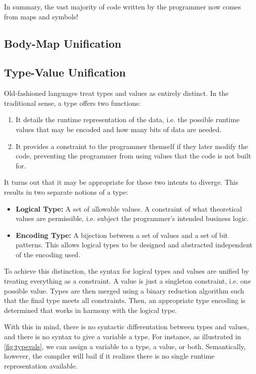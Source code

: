 \documentclass[12pt,a4paper,twoside]{report}
\begin{document}
In summary, the vast majority of code written by the programmer now comes from maps and symbols!

\subsection{Body-Map Unification}



\subsection{Type-Value Unification}

Old-fashioned languages treat types and values as entirely distinct. In the traditional sense, a type offers two functions:

\begin{enumerate}
\item It details the runtime representation of the data, i.e. the possible runtime values that may be encoded and how many bits of data are needed.
\item It provides a constraint to the programmer themself if they later modify the code, preventing the programmer from using values that the code is not built for.
\end{enumerate}

It turns out that it may be appropriate for these two intents to diverge. This results in two separate notions of a type:

\begin{itemize}
\item \textbf{Logical Type:} A set of allowable values. A constraint of what theoretical values are permissible, i.e. subject the programmer's intended business logic.
\item \textbf{Encoding Type:} A bijection between a set of values and a set of bit patterns. This allows logical types to be designed and abstracted independent of the encoding used.
\end{itemize}

To achieve this distinction, the syntax for logical types and values are unified by treating everything as a constraint. A value is just a singleton constraint, i.e. one possible value. Types are then merged using a binary reduction algorithm such that the final type meets all constraints. Then, an appropriate type encoding is determined that works in harmony with the logical type.

With this in mind, there is no syntactic differentation between types and values, and there is no syntax to give a variable a type. For instance, as illustrated in \autoref{fig:typevals}, we can assign a variable to a type, a value, or both. Semantically, however, the compiler will bail if it realizes there is no single runtime representation available.
\end{document}
